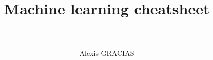 \documentclass[12pt,french]{report}
\title{
    \HRule \\[0.4cm] \Huge \bfseries 
    Machine learning cheatsheet 
    \\[0.15cm] \HRule \\[0.4cm]}
\author{\Large Alexis GRACIAS}
\begin{document}
\maketitle

\dominitoc %
\large \tableofcontents
\normalsize %

\renewcommand{\chaptermark}[1]{ \markboth{#1}{} }
\pagestyle{fancy}
\fancyhead{} %
\fancyhead[RO,LE]{\leftmark}
\fancyfoot{} %

\makeatletter
\renewcommand{\@evenfoot}{\makebox[\textwidth][c]{page {\thepage} sur \pageref{LastPage}}}
\renewcommand{\@oddfoot}{\@evenfoot}
\makeatother

\renewcommand{\labelitemi}{$\bullet$}
\renewcommand{\labelitemii}{---}
\renewcommand{\labelitemiii}{-}
\renewcommand{\labelitemiv}{.}



\end{document}

